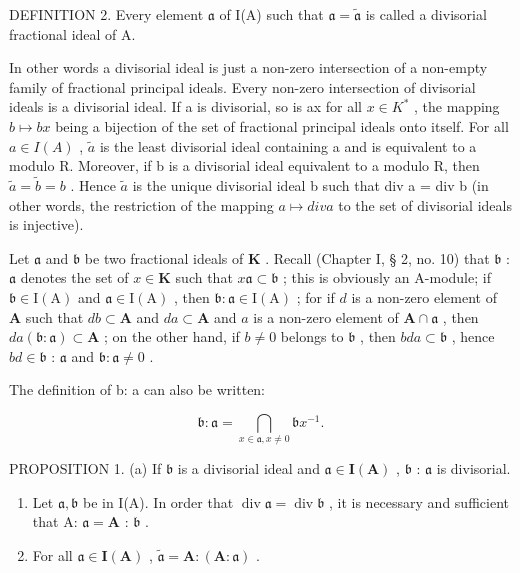 DEFINITION 2. Every element \(\mathfrak{a}\) of I(A) such that \(\mathfrak{a} = \tilde{\mathfrak{a}}\) is called a divisorial fractional ideal of A.

In other words a divisorial ideal is just a non-zero intersection of a non-empty family of fractional principal ideals. Every non-zero intersection of divisorial ideals is a divisorial ideal. If a is divisorial, so is ax for all \(x \in K^{*}\) , the mapping \(b \mapsto bx\) being a bijection of the set of fractional principal ideals onto itself. For all \(a \in I(A)\) , \(\tilde{a}\) is the least divisorial ideal containing a and is equivalent to a modulo R. Moreover, if b is a divisorial ideal equivalent to a modulo R, then \(\tilde{a} = \tilde{b} = b\) . Hence \(\tilde{a}\) is the unique divisorial ideal b such that div a = div b (in other words, the restriction of the mapping \(a \mapsto div a\) to the set of divisorial ideals is injective).

Let \(\mathfrak{a}\) and \(\mathfrak{b}\) be two fractional ideals of \(\mathbf{K}\) . Recall (Chapter I, § 2, no. 10) that \(\mathfrak{b}\) : \(\mathfrak{a}\) denotes the set of \(x \in \mathbf{K}\) such that \(x\mathfrak{a} \subset \mathfrak{b}\) ; this is obviously an A-module; if \(\mathfrak{b} \in \mathrm{I}(\mathrm{A})\) and \(\mathfrak{a} \in \mathrm{I}(\mathrm{A})\) , then \(\mathfrak{b} \colon \mathfrak{a} \in \mathrm{I}(\mathrm{A})\) ; for if \(d\) is a non-zero element of \(\mathbf{A}\) such that \(db \subset \mathbf{A}\) and \(da \subset \mathbf{A}\) and \(a\) is a non-zero element of \(\mathbf{A} \cap \mathfrak{a}\) , then \(da(\mathfrak{b} : \mathfrak{a}) \subset \mathbf{A}\) ; on the other hand, if \(b \neq 0\) belongs to \(\mathfrak{b}\) , then \(bda \subset \mathfrak{b}\) , hence \(bd \in \mathfrak{b}\) : \(\mathfrak{a}\) and \(\mathfrak{b} : \mathfrak{a} \neq 0\) .

The definition of b: a can also be written:

\[
\mathfrak {b}: \mathfrak {a} = \bigcap_ {x \in \mathfrak {a}, x \neq 0} \mathfrak {b} x ^ {- 1}.\tag{1}
\]

PROPOSITION 1. (a) If \(\mathfrak{b}\) is a divisorial ideal and \(\mathfrak{a} \in \mathbf{I}(\mathbf{A})\) , \(\mathfrak{b}\) : \(\mathfrak{a}\) is divisorial.

\begin{enumerate}
\def\labelenumi{(\alph{enumi})}
\setcounter{enumi}{1}
\item
  Let \(\mathfrak{a},\mathfrak{b}\) be in I(A). In order that \(\operatorname {div}\mathfrak{a} = \operatorname {div}\mathfrak{b}\) , it is necessary and sufficient that A: \(\mathfrak{a} = \mathbf{A}\) : \(\mathfrak{b}\) .
\item
  For all \(\mathfrak{a} \in \mathbf{I}(\mathbf{A})\) , \(\tilde{\mathfrak{a}} = \mathbf{A} : (\mathbf{A} : \mathfrak{a})\) .
\end{enumerate}

